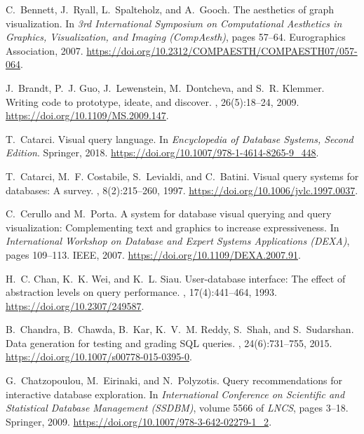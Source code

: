 \documentclass[letterpaper,11pt]{article}
\begin{document}
\begin{thebibliography}{100}
C.~Bennett, J.~Ryall, L.~Spalteholz, and A.~Gooch.
\newblock The aesthetics of graph visualization.
\newblock In {\em 3rd International Symposium on Computational Aesthetics in
  Graphics, Visualization, and Imaging (CompAesth)}, pages 57--64. Eurographics
  Association, 2007.
\newblock \url{https://doi.org/10.2312/COMPAESTH/COMPAESTH07/057-064}.

J.~Brandt, P.~J. Guo, J.~Lewenstein, M.~Dontcheva, and S.~R. Klemmer.
\newblock Writing code to prototype, ideate, and discover.
, 26(5):18--24, 2009.
\newblock \url{https://doi.org/10.1109/MS.2009.147}.

T.~Catarci.
\newblock Visual query language.
\newblock In {\em Encyclopedia of Database Systems, Second Edition}. Springer,
  2018.
\newblock \url{https://doi.org/10.1007/978-1-4614-8265-9\_448}.

T.~Catarci, M.~F. Costabile, S.~Levialdi, and C.~Batini.
\newblock Visual query systems for databases: A survey.
, 8(2):215--260, 1997.
\newblock \url{https://doi.org/10.1006/jvlc.1997.0037}.

C.~Cerullo and M.~Porta.
\newblock A system for database visual querying and query visualization:
  Complementing text and graphics to increase expressiveness.
\newblock In {\em International Workshop on Database and Expert Systems
  Applications (DEXA)}, pages 109--113. {IEEE}, 2007.
\newblock \url{https://doi.org/10.1109/DEXA.2007.91}.

H.~C. Chan, K.~K. Wei, and K.~L. Siau.
\newblock User-database interface: The effect of abstraction levels on query
  performance.
, 17(4):441--464, 1993.
\newblock \url{https://doi.org/10.2307/249587}.

B.~Chandra, B.~Chawda, B.~Kar, K.~V.~M. Reddy, S.~Shah, and S.~Sudarshan.
\newblock Data generation for testing and grading {SQL} queries.
, 24(6):731--755, 2015.
\newblock \url{https://doi.org/10.1007/s00778-015-0395-0}.

G.~Chatzopoulou, M.~Eirinaki, and N.~Polyzotis.
\newblock Query recommendations for interactive database exploration.
\newblock In {\em International Conference on Scientific and Statistical
  Database Management (SSDBM)}, volume 5566 of {\em LNCS}, pages 3--18.
  Springer, 2009.
\newblock \url{https://doi.org/10.1007/978-3-642-02279-1\_2}.


\end{thebibliography}
\end{document}
